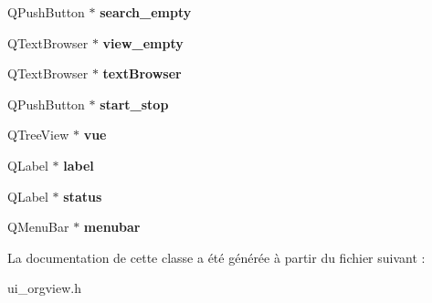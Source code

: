 \begin{DoxyCompactItemize}
\item 
\hypertarget{class_ui___org_view_a6ecf92571008c68476629e3ba8839ff1}{Q\-Push\-Button $\ast$ {\bfseries search\-\_\-empty}}\label{class_ui___org_view_a6ecf92571008c68476629e3ba8839ff1}

\item 
\hypertarget{class_ui___org_view_a08d3f945bc0dec78f719b8db359df609}{Q\-Text\-Browser $\ast$ {\bfseries view\-\_\-empty}}\label{class_ui___org_view_a08d3f945bc0dec78f719b8db359df609}

\item 
\hypertarget{class_ui___org_view_a072c0e185f24999aca89315bce02d85f}{Q\-Text\-Browser $\ast$ {\bfseries text\-Browser}}\label{class_ui___org_view_a072c0e185f24999aca89315bce02d85f}

\item 
\hypertarget{class_ui___org_view_a711bbee29b7c6ebe4e9073a0ed2e7f4a}{Q\-Push\-Button $\ast$ {\bfseries start\-\_\-stop}}\label{class_ui___org_view_a711bbee29b7c6ebe4e9073a0ed2e7f4a}

\item 
\hypertarget{class_ui___org_view_ad4c16eb931a988940910273ad90ef890}{Q\-Tree\-View $\ast$ {\bfseries vue}}\label{class_ui___org_view_ad4c16eb931a988940910273ad90ef890}

\item 
\hypertarget{class_ui___org_view_ae66a8c35e4bae47a02b1f1ca006fd480}{Q\-Label $\ast$ {\bfseries label}}\label{class_ui___org_view_ae66a8c35e4bae47a02b1f1ca006fd480}

\item 
\hypertarget{class_ui___org_view_a3d195c0b3eda35223a31c9402dbb46cc}{Q\-Label $\ast$ {\bfseries status}}\label{class_ui___org_view_a3d195c0b3eda35223a31c9402dbb46cc}

\item 
\hypertarget{class_ui___org_view_a25db5f5d75ec4ede06dab4539d532f2e}{Q\-Menu\-Bar $\ast$ {\bfseries menubar}}\label{class_ui___org_view_a25db5f5d75ec4ede06dab4539d532f2e}

\end{DoxyCompactItemize}


La documentation de cette classe a été générée à partir du fichier suivant \-:\begin{DoxyCompactItemize}
\item 
ui\-\_\-orgview.\-h\end{DoxyCompactItemize}
